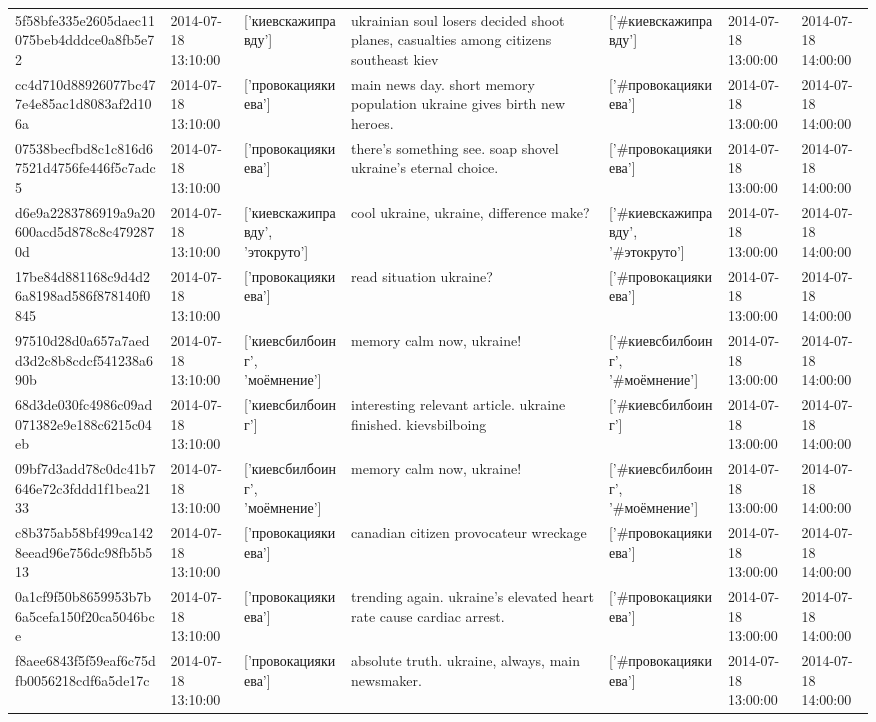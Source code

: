 \begin{tabular}{lllllll}
5f58bfe335e2605daec11075beb4dddce0a8fb5e72 & 2014-07-18 13:10:00 & ['киевскажиправду'] & ukrainian soul losers decided shoot planes, casualties among citizens southeast kiev & ['#киевскажиправду'] & 2014-07-18 13:00:00 & 2014-07-18 14:00:00 \\
cc4d710d88926077bc477e4e85ac1d8083af2d106a & 2014-07-18 13:10:00 & ['провокациякиева'] & main news day. short memory population ukraine gives birth new heroes. & ['#провокациякиева'] & 2014-07-18 13:00:00 & 2014-07-18 14:00:00 \\
07538becfbd8c1c816d67521d4756fe446f5c7adc5 & 2014-07-18 13:10:00 & ['провокациякиева'] & there's something see. soap shovel ukraine's eternal choice. & ['#провокациякиева'] & 2014-07-18 13:00:00 & 2014-07-18 14:00:00 \\
d6e9a2283786919a9a20600acd5d878c8c4792870d & 2014-07-18 13:10:00 & ['киевскажиправду', 'этокруто'] & cool ukraine, ukraine, difference make? & ['#киевскажиправду', '#этокруто'] & 2014-07-18 13:00:00 & 2014-07-18 14:00:00 \\
17be84d881168c9d4d26a8198ad586f878140f0845 & 2014-07-18 13:10:00 & ['провокациякиева'] & read situation ukraine? & ['#провокациякиева'] & 2014-07-18 13:00:00 & 2014-07-18 14:00:00 \\
97510d28d0a657a7aedd3d2c8b8cdcf541238a690b & 2014-07-18 13:10:00 & ['киевсбилбоинг', 'моёмнение'] & memory calm now, ukraine! & ['#киевсбилбоинг', '#моёмнение'] & 2014-07-18 13:00:00 & 2014-07-18 14:00:00 \\
68d3de030fc4986c09ad071382e9e188c6215c04eb & 2014-07-18 13:10:00 & ['киевсбилбоинг'] & interesting relevant article. ukraine finished. kievsbilboing & ['#киевсбилбоинг'] & 2014-07-18 13:00:00 & 2014-07-18 14:00:00 \\
09bf7d3add78c0dc41b7646e72c3fddd1f1bea2133 & 2014-07-18 13:10:00 & ['киевсбилбоинг', 'моёмнение'] & memory calm now, ukraine! & ['#киевсбилбоинг', '#моёмнение'] & 2014-07-18 13:00:00 & 2014-07-18 14:00:00 \\
c8b375ab58bf499ca1428eead96e756dc98fb5b513 & 2014-07-18 13:10:00 & ['провокациякиева'] & canadian citizen provocateur wreckage & ['#провокациякиева'] & 2014-07-18 13:00:00 & 2014-07-18 14:00:00 \\
0a1cf9f50b8659953b7b6a5cefa150f20ca5046bce & 2014-07-18 13:10:00 & ['провокациякиева'] & trending again. ukraine's elevated heart rate cause cardiac arrest. & ['#провокациякиева'] & 2014-07-18 13:00:00 & 2014-07-18 14:00:00 \\
f8aee6843f5f59eaf6c75dfb0056218cdf6a5de17c & 2014-07-18 13:10:00 & ['провокациякиева'] & absolute truth. ukraine, always, main newsmaker. & ['#провокациякиева'] & 2014-07-18 13:00:00 & 2014-07-18 14:00:00 \\

\end{tabular}
